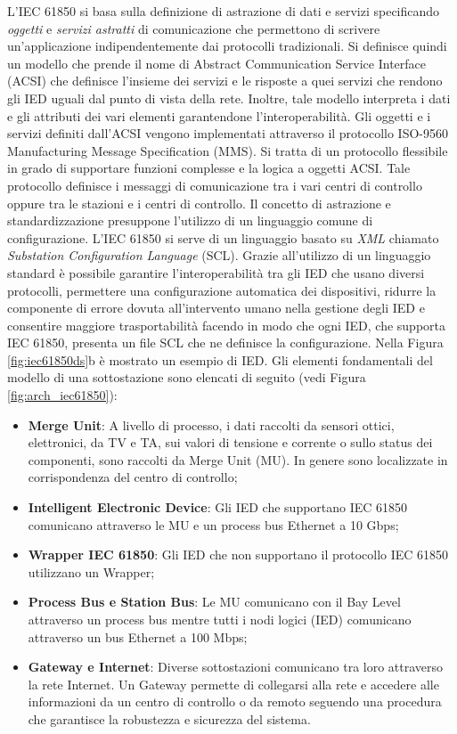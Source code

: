 L'IEC 61850 si basa sulla definizione di astrazione di dati e servizi specificando \emph{oggetti} e \emph{servizi astratti} di comunicazione che permettono di scrivere un'applicazione indipendentemente dai protocolli tradizionali. Si definisce quindi un modello che prende il nome di Abstract Communication Service Interface (ACSI) che definisce l'insieme dei servizi e le risposte a quei servizi che rendono gli IED uguali dal punto di vista della rete. Inoltre, tale modello interpreta i dati e gli attributi dei vari elementi garantendone l'interoperabilità. Gli oggetti e i servizi definiti dall'ACSI vengono implementati attraverso il protocollo ISO-9560 Manufacturing Message Specification (MMS). Si tratta di un protocollo flessibile in grado di supportare funzioni complesse e la logica a oggetti ACSI. Tale protocollo definisce i messaggi di comunicazione tra i vari centri di controllo oppure tra le stazioni e i centri di controllo.\newline\newline
Il concetto di astrazione e standardizzazione presuppone l'utilizzo di un linguaggio comune di configurazione. L'IEC 61850 si serve di un linguaggio basato su \emph{XML} chiamato \emph{Substation Configuration Language} (SCL). Grazie all'utilizzo di un linguaggio standard è possibile garantire l'interoperabilità tra gli IED che usano diversi protocolli, permettere una configurazione automatica dei dispositivi, ridurre la componente di errore dovuta all'intervento umano nella gestione degli IED e consentire maggiore trasportabilità facendo in modo che ogni IED, che supporta IEC 61850, presenta un file SCL che ne definisce la configurazione. Nella Figura \ref{fig:iec61850ds}b è mostrato un esempio di IED.\newpage
Gli elementi fondamentali del modello di una sottostazione sono elencati di seguito (vedi Figura \ref{fig:arch_iec61850}):
\begin{itemize}
	\item\textbf{Merge Unit}: A livello di processo, i dati raccolti da sensori ottici, elettronici, da TV e TA, sui valori di tensione e corrente o sullo status dei componenti, sono raccolti da Merge Unit (MU). In genere sono localizzate in corrispondenza del centro di controllo;
	\item\textbf{Intelligent Electronic Device}: Gli IED che supportano IEC 61850 comunicano attraverso le MU e un process bus Ethernet a 10 Gbps;
	\item\textbf{Wrapper IEC 61850}: Gli IED che non supportano il protocollo IEC 61850 utilizzano un Wrapper;
	\item\textbf{Process Bus e Station Bus}: Le MU comunicano con il Bay Level attraverso un process bus mentre tutti i nodi logici (IED) comunicano attraverso un bus Ethernet a 100 Mbps;
	\item\textbf{Gateway e Internet}: Diverse sottostazioni comunicano tra loro attraverso la rete Internet. Un Gateway permette di collegarsi alla rete e accedere alle informazioni da un centro di controllo o da remoto seguendo una procedura che garantisce la robustezza e sicurezza del sistema.
\end{itemize}

